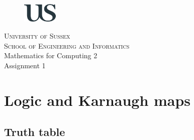 \documentclass[12pt]{article}
\begin{document}
\begin{titlepage}
\begin{figure}[t]
    \centering\includegraphics[width=0.15\textwidth]{logo}
\end{figure}
\begin{center}
    \textsc{ \LARGE{University of Sussex \\}}
	\textsc{School of Engineering and Informatics\\}
	\vspace{12mm}
	\fontsize{6mm}{7mm}\textnormal{Mathematics for Computing 2\\}
	\fontsize{10mm}{7mm}\selectfont
	\vspace{2mm}
    \textup{Assignment 1}\\
\end{center}

\vspace{25mm}


\end{titlepage}
\tableofcontents

\clearpage

\section{Logic and Karnaugh maps}
\subsection{Truth table}
\end{document}
